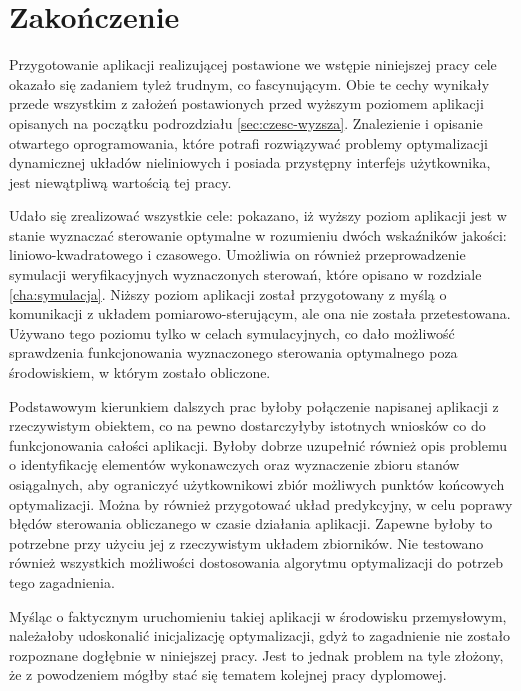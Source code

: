 \chapter*{Zakończenie}
\label{cha:zakonczenie}

Przygotowanie aplikacji realizującej postawione we wstępie niniejszej pracy cele okazało się zadaniem tyleż trudnym, co fascynującym. Obie te cechy wynikały przede wszystkim z założeń postawionych przed wyższym poziomem aplikacji opisanych na początku podrozdziału \ref{sec:czesc-wyzsza}. Znalezienie i opisanie otwartego oprogramowania, które potrafi rozwiązywać problemy optymalizacji dynamicznej układów nieliniowych i posiada przystępny interfejs użytkownika, jest niewątpliwą wartością tej pracy.

Udało się zrealizować wszystkie cele: pokazano, iż wyższy poziom aplikacji jest w stanie wyznaczać sterowanie optymalne w rozumieniu dwóch wskaźników jakości: liniowo-kwadratowego i czasowego. Umożliwia on również przeprowadzenie symulacji weryfikacyjnych wyznaczonych sterowań, które opisano w rozdziale \ref{cha:symulacja}. Niższy poziom aplikacji został przygotowany z myślą o komunikacji z układem pomiarowo-sterującym, ale ona nie została przetestowana. Używano tego poziomu tylko w celach symulacyjnych, co dało możliwość sprawdzenia funkcjonowania wyznaczonego sterowania optymalnego poza środowiskiem, w którym zostało obliczone.

Podstawowym kierunkiem dalszych prac byłoby połączenie napisanej aplikacji z rzeczywistym obiektem, co na pewno dostarczyłyby istotnych wniosków co do funkcjonowania całości aplikacji. Byłoby dobrze uzupełnić również opis problemu o identyfikację elementów wykonawczych oraz wyznaczenie zbioru stanów osiągalnych, aby ograniczyć użytkownikowi zbiór możliwych punktów końcowych optymalizacji. Można by również przygotować układ predykcyjny, w celu poprawy błędów sterowania obliczanego w czasie działania aplikacji. Zapewne byłoby to potrzebne przy użyciu jej z rzeczywistym układem zbiorników. Nie testowano również wszystkich możliwości dostosowania algorytmu optymalizacji do potrzeb tego zagadnienia.

Myśląc o faktycznym uruchomieniu takiej aplikacji w środowisku przemysłowym, należałoby udoskonalić inicjalizację optymalizacji, gdyż to zagadnienie nie zostało rozpoznane dogłębnie w niniejszej pracy. Jest to jednak problem na tyle złożony, że z powodzeniem mógłby stać się tematem kolejnej pracy dyplomowej.
